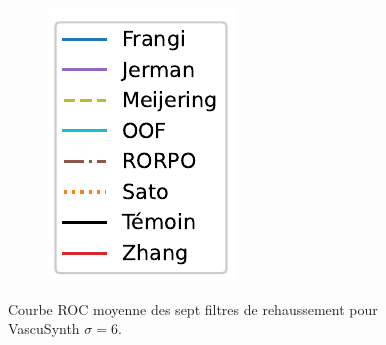 \begin{figure}[!ht]
\begin{subfigure}[t]{0.2\textwidth}
  \includegraphics[width=\textwidth,clip = true]{Images/standAloneLegend.pdf}
\end{subfigure}
\caption{Courbe ROC moyenne des sept filtres de rehaussement pour VascuSynth $\sigma=6$.}
  \label{fig:Vascu6_ROC}
\end{figure}

